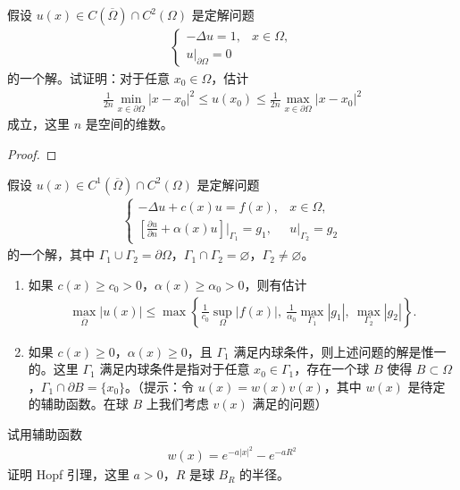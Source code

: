 \documentclass[../../main.tex]{subfiles}%
\begin{document}
\begin{example}
假设 $u(x)\in C(\overline{\Omega})\cap C^2(\Omega)$ 是定解问题
\begin{align*}
\begin{cases}
-\Delta u = 1, & x\in\Omega, \\
u|_{\partial\Omega} = 0
\end{cases}
\end{align*}
的一个解。试证明：对于任意 $x_0\in\Omega$，估计
\begin{align*}
\frac{1}{2n}\min_{x\in\partial\Omega}|x-x_0|^2 \leqslant u(x_0) \leqslant \frac{1}{2n}\max_{x\in\partial\Omega}|x-x_0|^2
\end{align*}
成立，这里 $n$ 是空间的维数。
\end{example}
\begin{proof}
\end{proof}

\begin{example}
假设 $u(x)\in C^1(\overline{\Omega})\cap C^2(\Omega)$ 是定解问题
\begin{align*}
\begin{cases}
-\Delta u + c(x)u = f(x), & x\in\Omega, \\
\left[\frac{\partial u}{\partial n}+\alpha(x)u\right]\bigg|_{\Gamma_1} = g_1, & u|_{\Gamma_2}=g_2
\end{cases}
\end{align*}
的一个解，其中 $\Gamma_1\cup\Gamma_2=\partial\Omega$，$\Gamma_1\cap\Gamma_2=\varnothing$，$\Gamma_2\neq\varnothing$。
\begin{enumerate}[(1)]
\item 如果 $c(x)\geqslant c_0>0$，$\alpha(x)\geqslant\alpha_0>0$，则有估计
\begin{align*}
\max_{\overline{\Omega}} |u(x)| \leqslant \max\left\{ \frac{1}{c_0}\sup_{\Omega}|f(x)|,\ \frac{1}{\alpha_0}\max_{\Gamma_1}|g_1|,\ \max_{\Gamma_2}|g_2| \right\}.
\end{align*}
\item 如果 $c(x)\geqslant 0$，$\alpha(x)\geqslant 0$，且 $\Gamma_1$ 满足内球条件，则上述问题的解是惟一的。这里 $\Gamma_1$ 满足内球条件是指对于任意 $x_0\in\Gamma_1$，存在一个球 $B$ 使得 $B\subset\Omega$，$\Gamma_1\cap\partial B=\{x_0\}$。（提示：令 $u(x)=w(x)v(x)$，其中 $w(x)$ 是待定的辅助函数。在球 $B$ 上我们考虑 $v(x)$ 满足的问题）
\end{enumerate}
\end{example}

\begin{example}
试用辅助函数
\begin{align*}
w(x)=e^{-a|x|^2}-e^{-aR^2}
\end{align*}
证明 Hopf 引理，这里 $a>0$，$R$ 是球 $B_R$ 的半径。
\end{example}
\end{document}
